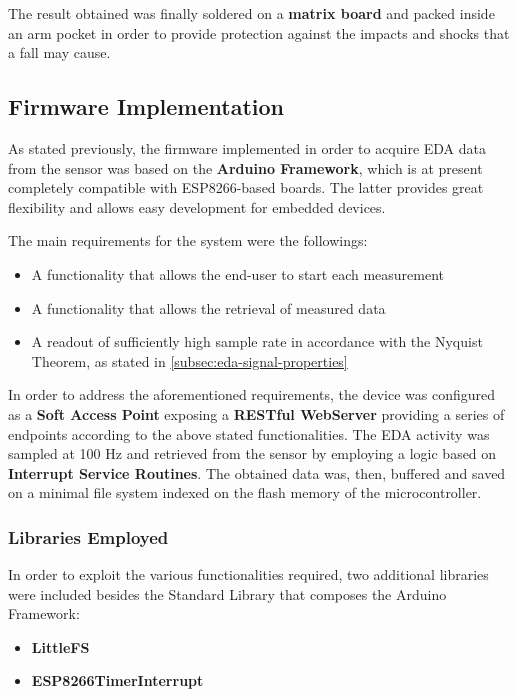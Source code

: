 The result obtained was finally soldered on a \textbf{matrix board} and packed inside an arm pocket in order to provide protection against the impacts and shocks that a fall may cause.  

\subsection{Firmware Implementation}\label{subsec:firmware-implementation}

As stated previously, the firmware implemented in order to acquire EDA data from the sensor was based on the \textbf{Arduino Framework}, which is at present completely compatible with ESP8266-based boards. The latter provides great flexibility and allows easy development for embedded devices. 

The main requirements for the system were the followings:

\begin{itemize}
    \item A functionality that allows the end-user to start each measurement
    \item A functionality that allows the retrieval of measured data
    \item A readout of sufficiently high sample rate in accordance with the Nyquist Theorem, as stated in \ref{subsec:eda-signal-properties}
\end{itemize}

In order to address the aforementioned requirements, the device was configured as a \textbf{Soft Access Point} exposing a \textbf{RESTful WebServer} providing a series of endpoints according to the above stated functionalities. The EDA activity was sampled at 100 Hz and retrieved from the sensor by employing a logic based on \textbf{Interrupt Service Routines}. The obtained data was, then, buffered and saved on a minimal file system indexed on the flash memory of the microcontroller.

\subsubsection{Libraries Employed}\label{subsubsec:libraries-employed}

In order to exploit the various functionalities required, two additional libraries were included besides the Standard Library that composes the Arduino Framework:

\begin{itemize}
    \item \textbf{LittleFS}
    \item \textbf{ESP8266TimerInterrupt}
\end{itemize}

